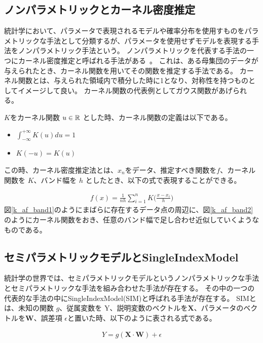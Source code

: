 \subsection{ノンパラメトリックとカーネル密度推定}
統計学において、パラメータで表現されるモデルや確率分布を使用すものをパラメトリックな手法として分類するが、パラメータを使用せずモデルを表現する手法をノンパラメトリック手法という。
ノンパラメトリックを代表する手法の一つにカーネル密度推定と呼ばれる手法がある~\cite{kernel_density}。
これは、ある母集団のデータが与えられたとき、カーネル関数を用いてその関数を推定する手法である。
カーネル関数とは、与えられた領域内で積分した時に1となり、対称性を持つものとしてイメージして良い。
カーネル関数の代表例としてガウス関数があげられる。

$ K $をカーネル関数 $ u \in \mathbb{R} $ とした時、カーネル関数の定義は以下である。

\begin{itemize}
  \item $ \int^{+ \infty}_{- \infty} K(u)du = 1 $
  \item $ K(-u) = K(u) $
\end{itemize}


この時、カーネル密度推定法とは、$ x_n $をデータ、推定すべき関数を$ f $、カーネル関数を $ K $、バンド幅を $ h $ としたとき、以下の式で表現することができる。


\begin{eqnarray}
f(x) = \frac{1}{nh} \sum^n_{i=1}K \bigl( \frac{x - x_i}{h}\bigr)
\label{eq:k-af}
\end{eqnarray}
図\ref{k_af_band1}のようにまばらに存在するデータ点の周辺に、図\ref{k_af_band2}のようにカーネル関数をおき、任意のバンド幅で足し合わせ近似していくようなものである。






\subsection{セミパラメトリックモデルとSingleIndexModel}

統計学の世界では、セミパラメトリックモデルというノンパラメトリックな手法とセミパラメトリックな手法を組み合わせた手法が存在する。
その中の一つの代表的な手法の中にSingleIndexModel(SIM)と呼ばれる手法が存在する。
SIMとは、未知の関数 $ g $、従属変数を $ \mathrm{Y} $、説明変数のベクトルを$ \mathbf{X} $、パラメータのベクトルを$ \mathbf{W} $、誤差項 $ \epsilon $と置いた時、以下のように表される式である。

\begin{eqnarray}
Y = g(\mathbf{X} \cdot  \mathbf{W}) + \epsilon
\label{eq:k-af}
\end{eqnarray}

